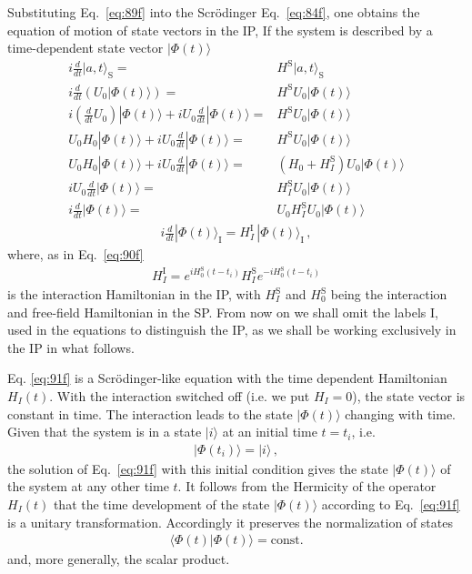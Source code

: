 Substituting Eq.~\eqref{eq:89f} into the Scr\"odinger Eq.~\eqref{eq:84f}, one obtains the equation of motion of state vectors in the IP, If the system is described by a time-dependent state vector $|\Phi(t)\rangle$
\begin{align}
  i\frac{d}{dt}|a,t\rangle_{\text{S}}=&  H^{\text{S}}|a,t\rangle_{\text{S}}\nonumber\\
  i\frac{d}{dt}\left(U_0|\Phi(t)\rangle\right)=&  H^{\text{S}}U_0|\Phi(t)\rangle\nonumber\\
  i\left(\frac{d}{dt}U_0\right)|\Phi(t)\rangle+iU_0\frac{d}{dt}|\Phi(t)\rangle=&  H^{\text{S}}U_0|\Phi(t)\rangle\nonumber\\
  U_0 H_0|\Phi(t)\rangle+iU_0\frac{d}{dt}|\Phi(t)\rangle=&  H^{\text{S}}U_0|\Phi(t)\rangle\nonumber\\
  U_0 H_0|\Phi(t)\rangle+iU_0\frac{d}{dt}|\Phi(t)\rangle=&  (H_0+H_I^{\text{S}})U_0|\Phi(t)\rangle\nonumber\\
  iU_0\frac{d}{dt}|\Phi(t)\rangle=&  H_I^{\text{S}}U_0|\Phi(t)\rangle\nonumber\\
  i\frac{d}{dt}|\Phi(t)\rangle=& U_0 H_I^{\text{S}}U_0|\Phi(t)\rangle
\end{align}
\begin{align}
\label{eq:91f}
  i\frac{d}{d t}|\Phi(t)\rangle_{\text{I}}=H^{\text{I}}_I\,|\Phi(t)\rangle_{\text{I}}\,,
\end{align}
where, as in Eq.~\eqref{eq:90f}
\begin{align}
  \label{eq:92f}
  H^{\text{I}}_I=e^{i H_0^{{\text{S}}}(t-t_i)}H^{\text{S}}_I e^{-i H_0^{{\text{S}}}(t-t_i)}
\end{align}
is the interaction Hamiltonian in the IP, with $H^{\text{S}}_I$ and $H^{\text{S}}_0$ being the interaction and free-field Hamiltonian in the SP. From now on we shall omit the labels I, used in the equations to distinguish the IP, as we shall be working exclusively in the IP in what follows.

Eq. \eqref{eq:91f} is a Scr\"odinger-like equation with the time dependent Hamiltonian $H_I(t)$. With the interaction switched off (i.e.  we put $H_I=0$), the state vector is constant in time. The interaction leads to the state $|\Phi(t)\rangle$ changing with time. Given that the system is in a state  $|i\rangle$ at an initial time $t=t_i$, i.e.
\begin{align}
\label{eq:93f}
  |\Phi(t_i)\rangle=|i\rangle\,,
\end{align}
the solution of Eq.~\eqref{eq:91f} with this initial condition gives the state $|\Phi(t)\rangle$ of the system at any other time $t$. It follows from the Hermicity of the operator $H_I(t)$ that the time development of the state $|\Phi(t)\rangle$ according to Eq.~\eqref{eq:91f} is a unitary transformation. Accordingly it preserves the normalization of states
\begin{align}
  \langle\Phi(t)|\Phi(t)\rangle=\text{const}.
\end{align}
and, more generally, the scalar product.

